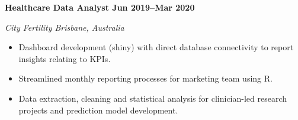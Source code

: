 \textbf{Healthcare Data Analyst \hfill Jun 2019--Mar 2020}\par
\textit{City Fertility \hfill Brisbane, Australia}\par
\begin{itemize}
	\item Dashboard development (shiny) with direct database connectivity to report insights relating to KPIs.
	\item Streamlined monthly reporting processes for marketing team using R.
    \item Data extraction, cleaning and statistical analysis for clinician-led research projects and prediction model development.
\end{itemize}\par